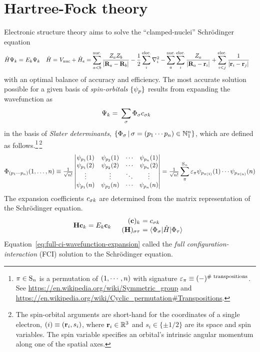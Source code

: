 \documentclass[11pt]{article}
\numberwithin{equation}{section}
\begin{document}
\section{Hartree-Fock theory}

Electronic structure theory aims to solve the ``clamped-nuclei'' Schr\"odinger equation
\begin{align}
\label{eq:electronic-schrodinger-equation}
  \hat{H}\Psi _k
=&\
  E_k\Psi _k
&
  \hat{H}
=&\
  V_{\mathrm{nuc}}
+
  \hat{H}_e
=
  \sum_{a<b}^{\text{nuc.}}
  \frac {Z_aZ_b}{|\mathbf{R}_a-\mathbf{R}_b|}
-
  \frac {1}{2}
  \sum_i^{\text{elec.}}
  \nabla_i^2
-
  \sum_a^{\text{nuc.}}
  \sum_i^{\text{elec.}}
  \frac {Z_a}{|\mathbf{R}_a-\mathbf{r}_i|}
+
  \sum_{i<j}^{\text{elec.}}
  \frac {1}{|\mathbf{r}_i-\mathbf{r}_j|}
\end{align}
with an optimal balance of accuracy and efficiency.
The most accurate solution possible for a given basis of \textit{spin-orbitals} $\{\psi _p\}$ results from expanding the wavefunction as
\begin{align}
\label{eq:full-ci-wavefunction-expansion}
  \Psi _k
=&\
  \sum_{\sigma }
  \Phi _{\sigma } c_{\sigma  k}
\end{align}
in the basis of \textit{Slater determinants}, $\{\Phi _{\sigma }\,|\,\sigma =(p_1\cdots p_n)\in\mathbb{N}_1^n\}$, which are defined as follows.\footnote{$\pi\in\mr{S}_n$ is a permutation of $(1,\cdots, n)$ with signature $\e_{\pi}\equiv(-)^{\text{\# transpositions}}$. See \url{https://en.wikipedia.org/wiki/Symmetric_group} and \url{https://en.wikipedia.org/wiki/Cyclic_permutation#Transpositions}.}\,\footnote{The spin-orbital arguments are short-hand for the coordinates of a single electron, $(i)\equiv(\mathbf{r}_i,s_i)$, where $\mathbf{r}_i\in\mathbb{R}^3$ and $s_i\in\{\pm1/2\}$ are its space and spin variables.  The spin variable specifies an orbital's intrinsic angular momentum along one of the spatial axes.}
\begin{align}\label{eq:slater-determinant-position-representation}
  \F_{(p_1\cd p_n)}(1,\ld,n)
\equiv
\tfr{1}{\sqrt{n!}}
\left|\ar{
  \y_{p_1}(1)&\y_{p_2}(1)&\cd&\y_{p_n}(1)\\
  \y_{p_1}(2)&\y_{p_2}(2)&\cd&\y_{p_n}(2)\\
  \vd    &\vd    &\dd&\vd    \\
  \y_{p_1}(n)&\y_{p_2}(n)&\cd&\y_{p_n}(n)}\right|
=
  \tfr{1}{\sqrt{n!}}
  \sum_{\pi}^{\mr{S}_n}
  \e_{\pi}
  \y_{p_{\pi(1)}}(1)\cd\y_{p_{\pi(n)}}(n)
\end{align}
The expansion coefficients $c_{\sigma  k}$ are determined from the matrix representation of the Schr\"odinger equation.
\begin{align}
  \bo{H}
  \bo{c}_k
=
  E_k
  \bo{c}_k
&&
\begin{array}{r@{\ }l}
  (\bo{c})_k
&=
  c_{\si k}
\\
  (\bo{H})_{\si\ta}
&=
  \ip{\F_\si|\op{H}|\F_\ta}
\end{array}
\end{align}
Equation~\ref{eq:full-ci-wavefunction-expansion} called the {\it full configuration-interaction} (FCI) solution to the Schr\"odinger equation.
\end{document}
